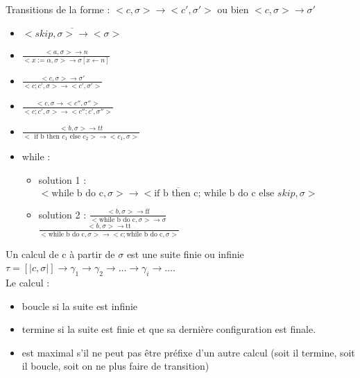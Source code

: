 \documentclass[10pt,a4paper]{article}
\newcommand{\semm}[1]{\left[| #1 | \right]}
\begin{document}
\noindent Transitions de la forme : $<c, \sigma> \rightarrow <c', \sigma'>$ ou bien $<c, \sigma> \rightarrow \sigma'$\\
\begin{itemize}


\item $\displaystyle \overline{ <skip, \sigma > \rightarrow <\sigma> }$\\
\item $\displaystyle\frac{<a, \sigma > \rightarrow n }{ < x := \alpha , \sigma > \rightarrow \sigma [x \leftarrow n ] }$\\
\item $\displaystyle \frac{ <c, \sigma > \rightarrow \sigma' }{  < c; c' , \sigma > \rightarrow <c', \sigma'> }$\\
\item $\displaystyle \frac{< c, \sigma \rightarrow <c'', \sigma''>}{ <c; c', \sigma > \rightarrow <c''; c', \sigma'' > }$\\
\item $\displaystyle \frac{ <b, \sigma> \rightarrow tt }{<\text{ if b then }  c_1\text{ else }c_2> \rightarrow <c_1, \sigma > }$\\
\item while : \begin{itemize}


 \item solution 1 : $\displaystyle \overline{ < \text{while b do c}, \sigma > \rightarrow < \text{if b then c; while b do c else }skip, \sigma > }$\\
 
\item solution 2 : $\displaystyle \frac{ < b, \sigma > \rightarrow \text{ff}}{ < \text{while b do c}, \sigma > \rightarrow \sigma }$\\

$\displaystyle  \frac{ < b, \sigma > \rightarrow \text{tt}}{ < \text{while b do c}, \sigma > \rightarrow <c;\text{while b do c}, \sigma >}$\\
\end{itemize}
\end{itemize}

\begin{definition}[Calcul] Un calcul de c à partir de $\sigma$ est une suite finie ou infinie 
$\tau = \semm{c, \sigma} \rightarrow \gamma_1 \rightarrow \gamma_2 \rightarrow \dotsc \rightarrow \gamma_i \rightarrow \dotsc$.\\
Le calcul :\begin{itemize}
\item boucle si la suite est infinie
\item termine si la suite est finie et que sa dernière configuration est finale.
\item est maximal s'il ne peut pas \^etre préfixe d'un autre calcul (soit il termine, soit il boucle, soit on ne plus faire de transition)
\end{itemize}
\end{definition}
\end{document}
